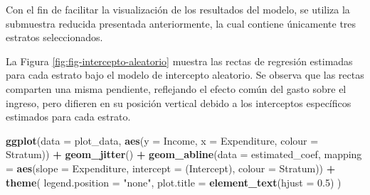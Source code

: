 \documentclass[
  spanish,
  12pt,
]{book}
\newenvironment{Shaded}{\begin{snugshade}}{\end{snugshade}}
\newcommand{\AttributeTok}[1]{\textcolor[rgb]{0.13,0.29,0.53}{#1}}
\newcommand{\FloatTok}[1]{\textcolor[rgb]{0.00,0.00,0.81}{#1}}
\newcommand{\FunctionTok}[1]{\textcolor[rgb]{0.13,0.29,0.53}{\textbf{#1}}}
\newcommand{\NormalTok}[1]{#1}
\newcommand{\OtherTok}[1]{\textcolor[rgb]{0.56,0.35,0.01}{#1}}
\newcommand{\SpecialCharTok}[1]{\textcolor[rgb]{0.81,0.36,0.00}{\textbf{#1}}}
\newcommand{\StringTok}[1]{\textcolor[rgb]{0.31,0.60,0.02}{#1}}
\begin{document}
Con el fin de facilitar la visualización de los resultados del modelo, se utiliza la submuestra reducida presentada anteriormente, la cual contiene únicamente tres estratos seleccionados.

\begin{Shaded}
\end{Shaded}

La Figura \ref{fig:fig-intercepto-aleatorio} muestra las rectas de regresión estimadas para cada estrato bajo el modelo de intercepto aleatorio. Se observa que las rectas comparten una misma pendiente, reflejando el efecto común del gasto sobre el ingreso, pero difieren en su posición vertical debido a los interceptos específicos estimados para cada estrato.

\begin{Shaded}
\begin{Highlighting}[]
\FunctionTok{ggplot}\NormalTok{(}\AttributeTok{data =}\NormalTok{ plot\_data,}
       \FunctionTok{aes}\NormalTok{(}\AttributeTok{y =}\NormalTok{ Income, }\AttributeTok{x =}\NormalTok{ Expenditure, }\AttributeTok{colour =}\NormalTok{ Stratum)) }\SpecialCharTok{+}
  \FunctionTok{geom\_jitter}\NormalTok{() }\SpecialCharTok{+}
  \FunctionTok{geom\_abline}\NormalTok{(}\AttributeTok{data =}\NormalTok{ estimated\_coef,}
              \AttributeTok{mapping =} \FunctionTok{aes}\NormalTok{(}\AttributeTok{slope =}\NormalTok{ Expenditure,}
                            \AttributeTok{intercept =} \StringTok{\textasciigrave{}}\AttributeTok{(Intercept)}\StringTok{\textasciigrave{}}\NormalTok{,}
                            \AttributeTok{colour =}\NormalTok{ Stratum)) }\SpecialCharTok{+}
  \FunctionTok{theme}\NormalTok{(}
    \AttributeTok{legend.position =} \StringTok{"none"}\NormalTok{,}
    \AttributeTok{plot.title =} \FunctionTok{element\_text}\NormalTok{(}\AttributeTok{hjust =} \FloatTok{0.5}\NormalTok{)}
\NormalTok{  )}
\end{Highlighting}
\end{Shaded}
\end{document}
